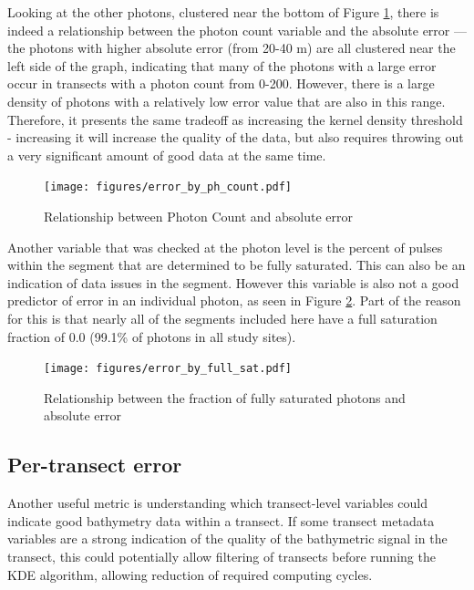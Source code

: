 Looking at the other photons, clustered near the bottom of Figure \ref{fig:photon-cnt-v-abs-error}, there is indeed a relationship between the photon count variable and the absolute error --- the photons with higher absolute error (from 20-40 m) are all clustered near the left side of the graph, indicating that many of the photons with a large error occur in transects with a photon count from 0-200. However, there is a large density of photons with a relatively low error value that are also in this range. Therefore, it presents the same tradeoff as increasing the kernel density threshold - increasing it will increase the quality of the data, but also requires throwing out a very significant amount of good data at the same time. 

\begin{figure}[htbp]
    \centering
    \texttt{[image: figures/error\_by\_ph\_count.pdf]}
    \caption{Relationship between Photon Count and absolute error}
    \label{fig:photon-cnt-v-abs-error}
\end{figure}

Another variable that was checked at the photon level is the percent of pulses within the segment that are determined to be fully saturated. This can also be an indication of data issues in the segment. However this variable is also not a good predictor of error in an individual photon, as seen in Figure \ref{fig:full-sat-frac-v-abs-error}. Part of the reason for this is that nearly all of the segments included here have a full saturation fraction of 0.0 (99.1\% of photons in all study sites). 

\begin{figure}[htbp]
    \centering
    \texttt{[image: figures/error\_by\_full\_sat.pdf]}
    \caption{Relationship between the fraction of fully saturated photons and absolute error}
    \label{fig:full-sat-frac-v-abs-error}
\end{figure}

\subsection{Per-transect error}

Another useful metric is understanding which transect-level variables could indicate good bathymetry data within a transect. If some transect metadata variables are a strong indication of the quality of the bathymetric signal in the transect, this could potentially allow filtering of transects before running the KDE algorithm, allowing reduction of required computing cycles.

